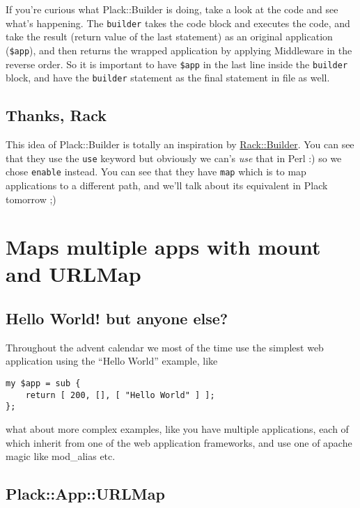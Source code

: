 If you're curious what Plack::Builder is doing, take a look at the code
and see what's happening. The \lstinline!builder! takes the code block
and executes the code, and take the result (return value of the last
statement) as an original application (\lstinline!$app!), and then
returns the wrapped application by applying Middleware in the reverse
order. So it is important to have \lstinline!$app! in the last line
inside the \lstinline!builder! block, and have the \lstinline!builder!
statement as the final statement in  file as well.

\section{Thanks, Rack}\label{thanks-rack}

This idea of Plack::Builder is totally an inspiration by
\href{http://m.onkey.org/2008/11/18/ruby-on-rack-2-rack-builder}{Rack::Builder}.
You can see that they use the \lstinline!use! keyword but obviously we
can's \emph{use} that in Perl :) so we chose \lstinline!enable! instead.
You can see that they have \lstinline!map! which is to map applications
to a different path, and we'll talk about its equivalent in Plack
tomorrow ;)

\chapter{Maps multiple apps with mount and
URLMap}\label{day-12-maps-multiple-apps-with-mount-and-urlmap}

\section{Hello World! but anyone
else?}\label{hello-world-but-anyone-else}

Throughout the advent calendar we most of the time use the simplest web
application using the ``Hello World'' example, like

\begin{lstlisting}
my $app = sub {
    return [ 200, [], [ "Hello World" ] ];
};
\end{lstlisting}

what about more complex examples, like you have multiple applications,
each of which inherit from one of the web application frameworks, and
use one of apache magic like mod\_alias etc.

\section{Plack::App::URLMap}\label{plackappurlmap}

